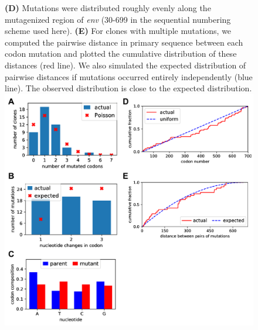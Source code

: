 \documentclass[9pt,lineno]{elife}
\begin{document}
\begin{figure}
{{\bf(D)} Mutations were distributed roughly evenly along the mutagenized region of {\it env} (30-699 in the sequential numbering scheme used here).
{\bf(E)} For clones with multiple mutations, we computed the pairwise distance in primary sequence between each codon mutation and plotted the cumulative distribution of these distances (red line). 
We also simulated the expected distribution of pairwise distances if mutations occurred entirely independently (blue line). 
The observed distribution is close to the expected distribution.
}{\includegraphics[width=\textwidth]{figures/sanger_sequencing_supp/sanger_sequencing_supp.pdf}}
\end{figure}
\FloatBarrier
\end{document}
